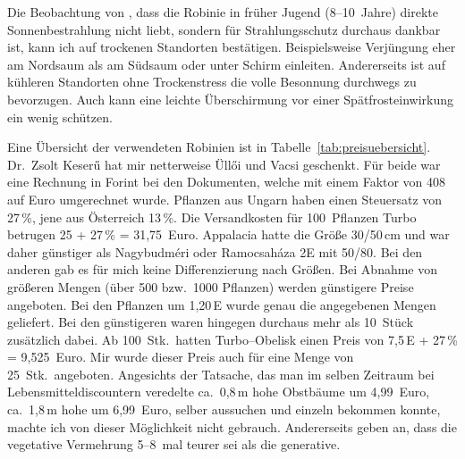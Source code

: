\documentclass[twocolumn]{scrartcl}
\begin{document}
Die Beobachtung von \citet[S.~69, 86]{erteld1952robinieErtrag}, dass die
Robinie in früher Jugend (8--10~Jahre) direkte Sonnenbestrahlung nicht liebt,
sondern für Strahlungsschutz durchaus dankbar ist, kann ich auf
trockenen Standorten bestätigen. Beispielsweise Verjüngung eher am
Nordsaum als am Südsaum oder unter Schirm einleiten.
Andererseits ist auf kühleren
Standorten ohne Trockenstress die volle Besonnung durchwegs zu
bevorzugen.
Auch kann eine leichte Überschirmung vor einer Spätfrosteinwirkung
ein wenig schützen.

Eine Übersicht der verwendeten Robinien ist in
Tabelle~\ref{tab:preisuebersicht}. Dr.~Zsolt Keserű hat mir netterweise Üllői und Vacsi geschenkt. Für beide war eine Rechnung in Forint
bei den Dokumenten, welche mit einem Faktor von 408 auf Euro
umgerechnet wurde. Pflanzen aus Ungarn haben einen Steuersatz von
27\,\%, jene aus Österreich 13\,\%. Die Versandkosten für 100~Pflanzen Turbo betrugen 25 +
27\,\% = 31,75~Euro. Appalacia hatte die Größe 30/50\,cm und
war daher günstiger als Nagybudméri oder Ramocsaháza 2E mit 50/80. Bei
den anderen gab es für mich keine Differenzierung nach Größen. Bei
Abnahme von größeren Mengen (über 500 bzw.\ 1000 Pflanzen) werden
günstigere Preise angeboten.
Bei den Pflanzen um 1,20\,E wurde genau die angegebenen Mengen geliefert.
Bei den günstigeren waren hingegen durchaus mehr als 10~Stück zusätzlich dabei.
Ab 100~Stk.\ hatten Turbo--Obelisk einen Preis von 7,5\,E +
27\,\% = 9,525~Euro. Mir wurde dieser Preis auch für eine
Menge von 25~Stk.\ angeboten. Angesichts der Tatsache, das man im
selben Zeitraum bei Lebensmitteldiscountern veredelte ca.\ 0,8\,m hohe
Obstbäume um 4,99~Euro, ca.\ 1,8\,m hohe um 6,99~Euro, selber
aussuchen und einzeln bekommen konnte, machte ich von dieser
Möglichkeit nicht gebrauch. Andererseits geben
\citet{redei2005robinieVermehrung} an, dass die vegetative Vermehrung
5--8~mal teurer sei als die generative.
\end{document}
